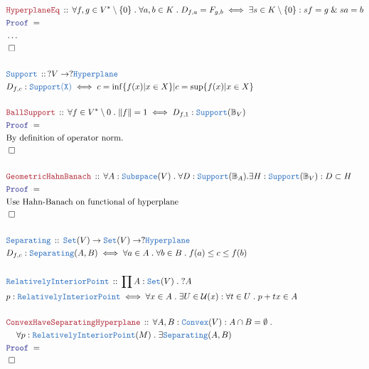 \documentclass[12pt]{scrartcl}
\newcommand{\TYPE}[1]{\textcolor{NavyBlue}{\mathtt{#1}}}
\newcommand{\LOGIC}[1]{\textcolor{Blue}{\mathtt{#1}}}
\newcommand{\THM}[1]{\textcolor{Maroon}{\mathtt{#1}}}
\renewcommand{\.}{\; . \;}
\newcommand{\Theorem}[2]{& \THM{#1} \, :: \, #2 \\ & \Proof = \\ }
\newcommand{\DeclareType}[2]{& \TYPE{#1} \, :: \, #2 \\}
\newcommand{\DefineType}[3]{& #1 : \TYPE{#2} \iff #3 \\}
\newcommand{\NewLine}{\\ & \kern 1pc}
\newcommand{\Page}[1]{\begin{align*} #1 \end{align*} \newpage   }
\newcommand{\NoProof}{ & \ldots \\ \EndProof}
\renewcommand{\And}{\; \& \;}
\newcommand{\Set}{\TYPE{Set}}
\newcommand{\QED}{\; \square}
\newcommand{\EndProof}{& \QED \\}
\newcommand{\Proof}{\LOGIC{Proof} \; }
\newcommand{\Ball}{ \mathbb{B} }
\begin{document}
  \Page{
      \Theorem{HyperplaneEq}{\forall f, g \in V^* \setminus \{ 0 \} \.
      \forall a, b \in K \. D_{f,a} = F_{g,b} \iff \exists s \in K \setminus \{ 0 \}
       : sf = g \And sa = b            
      } 
      \NoProof
      \\
      \DeclareType{Support}{ ?V \to ?\TYPE{Hyperplane}}
      \DefineType{D_{f,c}}{Support(X)}{ c = \inf \{ f(x) | x \in X  \} | 
       c = \sup \{ f(x) | x \in X  \}  }  
      \\
      \Theorem{BallSupport}{ \forall f \in V^* \setminus 0 \. \| f \| = 1 \iff
       D_{f,1} : \TYPE{Support}(\mathbb{B}_V)      
       }
       & \textrm{By definition of operator norm.} \\
       \EndProof
       \\
       \Theorem{GeometricHahnBanach}
       {\forall A : \TYPE{Subspace}(V) \. \forall D : \TYPE{Support}(\Ball_A) . \exists
        H : \TYPE{Support}(\Ball_V) : D \subset H       
       }
       & \textrm{Use Hahn-Banach on functional of hyperplane} \\
       \EndProof
       \\
       \DeclareType{Separating}{ \Set(V) \to \Set(V) \to ?\TYPE{Hyperplane}}
       & D_{f,c} : \TYPE{Separating}(A,B) \iff \forall a \in A \. \forall b \in B \. f(a) \le c \le f(b)         \\
       \\
      \DeclareType{RelativelyInteriorPoint}{\prod A : \Set(V) \. ?A}
      \DefineType{ p }{ \TYPE{RelativelyInteriorPoint} }{ \forall x \in A \. \exists U \in 
       \mathcal{U}(x) : \forall t \in U \.  p + tx \in A      
       }
       \\
       \Theorem{ConvexHaveSeparatingHyperplane}{ \forall A,B : \TYPE{Convex}(V)  : A \cap B = \emptyset \. 
 \NewLine
  \forall p : \TYPE{RelativelyInteriorPoint}(M) \. \exists \TYPE{Separating}(A,B)       
         }
   \EndProof
   }
\end{document}
